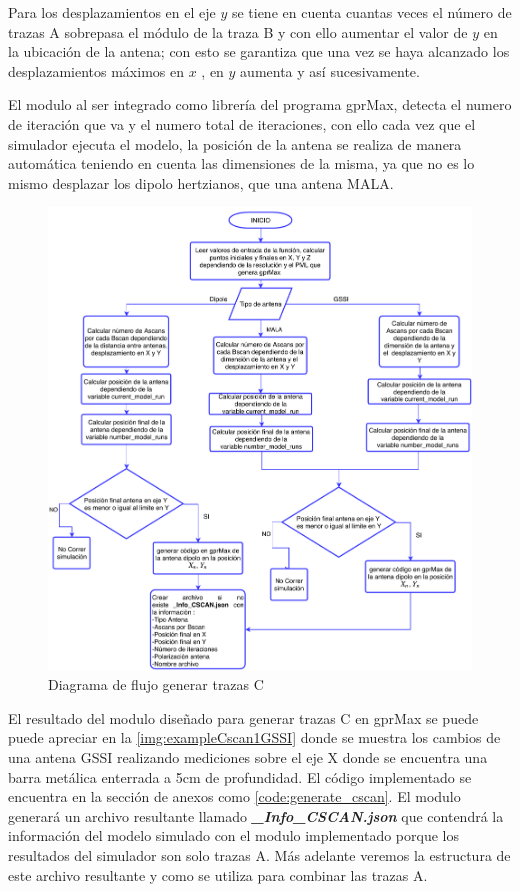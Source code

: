 Para los desplazamientos en el eje \(y\) se tiene en cuenta cuantas veces el número de trazas A sobrepasa el módulo de la traza B y con ello  aumentar el valor de \(y\) en la ubicación de la antena; con esto se garantiza que una vez se haya alcanzado los desplazamientos máximos en \(x\) , en \(y\) aumenta y así sucesivamente.

El modulo al ser integrado como librería del programa gprMax, detecta el numero de iteración que va y el numero total de iteraciones, con ello  cada vez que el simulador ejecuta el modelo, la posición de la antena se realiza de manera automática teniendo en cuenta las dimensiones de la misma, ya que no es lo mismo desplazar los dipolo hertzianos, que una antena MALA.

\begin{figure}[H]
\centering
\includegraphics[height=\textheight-9cm,keepaspectratio]{chapter1/images/diagrama_flujo_cscan.pdf}
\caption{Diagrama de flujo generar trazas C}
\label{fig:FlowDiag_TrazasC}
\end{figure}
El resultado del modulo diseñado para generar trazas C en gprMax se puede puede apreciar en la  \figurename{ \ref{img:exampleCscan1GSSI}} donde se muestra los cambios de una antena GSSI realizando mediciones sobre el eje X donde se encuentra una barra metálica enterrada a  5cm de profundidad. El código implementado se encuentra en la sección de anexos como \lstlistingname{ \ref{code:generate_cscan}}. El modulo generará un archivo resultante llamado \textbf{\textit{\_Info\_CSCAN.json}} que contendrá la información del modelo simulado con el modulo implementado porque los resultados del simulador son solo trazas A. Más adelante veremos la estructura de este archivo resultante y como se utiliza para combinar las trazas A.

